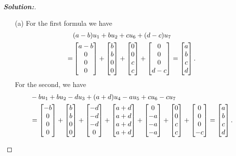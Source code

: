 \documentclass[a4paper]{amsart}
\theoremstyle{definition}
\newenvironment{solution}{\begin{proof}[\textbf{Solution:}] \vphantom{u}}{\end{proof}}
\begin{document}
\begin{solution}
 \begin{itemize}
  \item[(a)] For the first formula we have
   \begin{align*}
    & (a-b)u_1 + b u_2 + c u_6 + (d-c)u_7 \\
    =& \left[\begin{matrix} a-b \\ 0 \\ 0 \\ 0 \end{matrix}\right] + 
       \left[\begin{matrix} b \\ b \\ 0 \\ 0 \end{matrix}\right] +
       \left[\begin{matrix} 0 \\ 0 \\ c \\ c \end{matrix}\right] + 
       \left[\begin{matrix} 0 \\ 0 \\ 0 \\ d-c \end{matrix}\right] 
    = \left[\begin{matrix} a \\ b \\ c \\ d \end{matrix}\right]. 
   \end{align*}
   For the second, we have
   \begin{align*}
    & -bu_1+bu_2-du_3+(a+d)u_4 -a u_5 + cu_6 -cu_7 \\
    &=  \bbm  -b \\   0 \\   0 \\   0 \ebm +
        \bbm   b \\   b \\   0 \\   0 \ebm +
        \bbm  -d \\  -d \\  -d \\   0 \ebm +
        \bbm a+d \\ a+d \\ a+d \\ a+d \ebm +
        \bbm   0 \\  -a \\  -a \\  -a \ebm +
        \bbm   0 \\   0 \\   c \\   c \ebm +
        \bbm   0 \\   0 \\   0 \\  -c \ebm 
      = \bbm   a \\   b \\   c \\   d \ebm.

\end{align*}
\end{itemize}
\end{solution}
\end{document}
